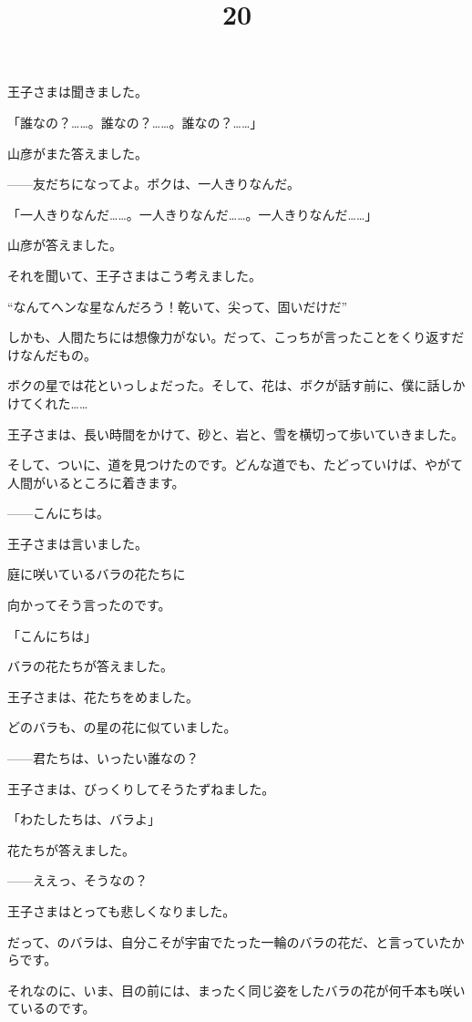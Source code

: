 王子さまは聞きました。

「誰なの？……。誰なの？……。誰なの？……」

山彦がまた答えました。

——友だちになってよ。ボクは、一人きりなんだ。

「一人きりなんだ……。一人きりなんだ……。一人きりなんだ……」

山彦が答えました。

それを聞いて、王子さまはこう考えました。

“なんてへンな星なんだろう！乾いて、尖って、固いだけだ”

しかも、人間たちには想像力がない。だって、こっちが言ったことをくり返すだけなんだもの。

ボクの星では花といっしょだった。そして、花は、ボクが話す前に、僕に話しかけてくれた……

\title{20}


王子さまは、長い時間をかけて、砂と、岩と、雪を横切って歩いていきました。

そして、ついに、道を見つけたのです。どんな道でも、たどっていけば、やがて人間がいるところに着きます。


——こんにちは。

王子さまは言いました。

庭に咲いているバラの花たちに

向かってそう言ったのです。

「こんにちは」

バラの花たちが答えました。

王子さまは、花たちをめました。

どのバラも、の星の花に似ていました。

——君たちは、いったい誰なの？

王子さまは、びっくりしてそうたずねました。

「わたしたちは、バラよ」

花たちが答えました。


——ええっ、そうなの？

王子さまはとっても悲しくなりました。

だって、のバラは、自分こそが宇宙でたった一輪のバラの花だ、と言っていたからです。

それなのに、いま、目の前には、まったく同じ姿をしたバラの花が何千本も咲いているのです。

